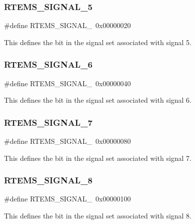 \subsubsection{\texorpdfstring{RTEMS\_SIGNAL\_5}{RTEMS\_SIGNAL\_5}}
{\footnotesize\ttfamily \#define R\+T\+E\+M\+S\+\_\+\+S\+I\+G\+N\+A\+L\+\_~0x00000020}

This defines the bit in the signal set associated with signal 5. \mbox{\label{group__ClassicASR_gaaf963213de935915c9310cfdae6f01cf}} 
\subsubsection{\texorpdfstring{RTEMS\_SIGNAL\_6}{RTEMS\_SIGNAL\_6}}
{\footnotesize\ttfamily \#define R\+T\+E\+M\+S\+\_\+\+S\+I\+G\+N\+A\+L\+\_~0x00000040}

This defines the bit in the signal set associated with signal 6. \mbox{\label{group__ClassicASR_ga1140efbcca58fe12b5041a1f20ddaeb9}} 
\subsubsection{\texorpdfstring{RTEMS\_SIGNAL\_7}{RTEMS\_SIGNAL\_7}}
{\footnotesize\ttfamily \#define R\+T\+E\+M\+S\+\_\+\+S\+I\+G\+N\+A\+L\+\_~0x00000080}

This defines the bit in the signal set associated with signal 7. \mbox{\label{group__ClassicASR_gab68581bbf73c6e1b736ec70171e90a11}} 
\subsubsection{\texorpdfstring{RTEMS\_SIGNAL\_8}{RTEMS\_SIGNAL\_8}}
{\footnotesize\ttfamily \#define R\+T\+E\+M\+S\+\_\+\+S\+I\+G\+N\+A\+L\+\_~0x00000100}

This defines the bit in the signal set associated with signal 8. \mbox{\label{group__ClassicASR_ga936c6c5c5a804d30bf4181ea2667e390}} 
